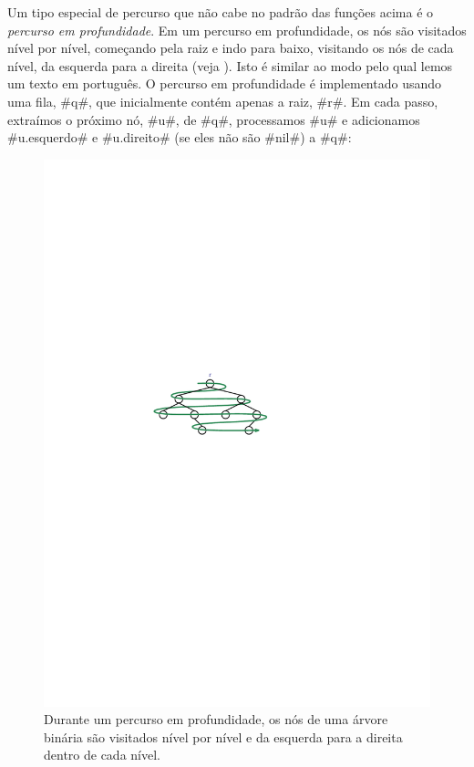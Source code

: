 Um tipo especial de percurso que não cabe no padrão das funções acima é o \emph{percurso em profundidade}.
%
%
Em um percurso em profundidade, os nós são visitados nível por nível, começando pela raiz e indo para baixo, visitando os nós de cada nível, da esquerda para a direita
(veja
). Isto é similar ao modo pelo qual lemos um texto em português.   O percurso em profundidade é implementado usando uma fila, #q#, que inicialmente contém apenas a raiz, #r#.  Em cada passo,
extraímos o próximo nó, #u#, de #q#, processamos #u# e adicionamos #u.esquerdo#
e #u.direito# (se eles não são #nil#) a #q#:

\begin{figure}
  \begin{center}
    \includegraphics[scale=0.90909]{figs/bintree-4}
  \end{center}
  \caption{Durante um percurso em profundidade, os nós de uma árvore binária são visitados nível por nível e da esquerda para a direita dentro de cada nível.}
\end{figure}





